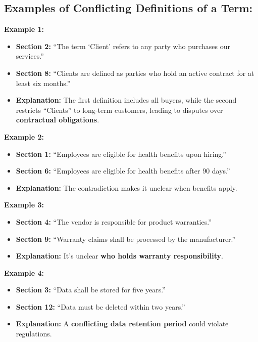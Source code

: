 \documentclass[11pt]{article}
\begin{document}
\begin{tcolorbox}[breakable,colback=lightestgray,colframe=black,title=\textbf{Ambiguity In-Text Data Generation Prompt}]
\subsection*{\textbf{Examples of Conflicting Definitions of a Term:}}

\textbf{Example 1:}
\begin{itemize}
    \item \textbf{Section 2:} ``The term `Client' refers to any party who purchases our services.''
    \item \textbf{Section 8:} ``Clients are defined as parties who hold an active contract for at least six months.''
    \item \textbf{Explanation:} The first definition includes all buyers, while the second restricts ``Clients'' to long-term customers, leading to disputes over \textbf{contractual obligations}.
\end{itemize}

\textbf{Example 2:}
\begin{itemize}
    \item \textbf{Section 1:} ``Employees are eligible for health benefits upon hiring.''
    \item \textbf{Section 6:} ``Employees are eligible for health benefits after 90 days.''
    \item \textbf{Explanation:} The contradiction makes it unclear when benefits apply.
\end{itemize}

\textbf{Example 3:}
\begin{itemize}
    \item \textbf{Section 4:} ``The vendor is responsible for product warranties.''
    \item \textbf{Section 9:} ``Warranty claims shall be processed by the manufacturer.''
    \item \textbf{Explanation:} It's unclear \textbf{who holds warranty responsibility}.
\end{itemize}

\textbf{Example 4:}
\begin{itemize}
    \item \textbf{Section 3:} ``Data shall be stored for five years.''
    \item \textbf{Section 12:} ``Data must be deleted within two years.''
    \item \textbf{Explanation:} A \textbf{conflicting data retention period} could violate regulations.
\end{itemize}


\end{tcolorbox}
\end{document}
